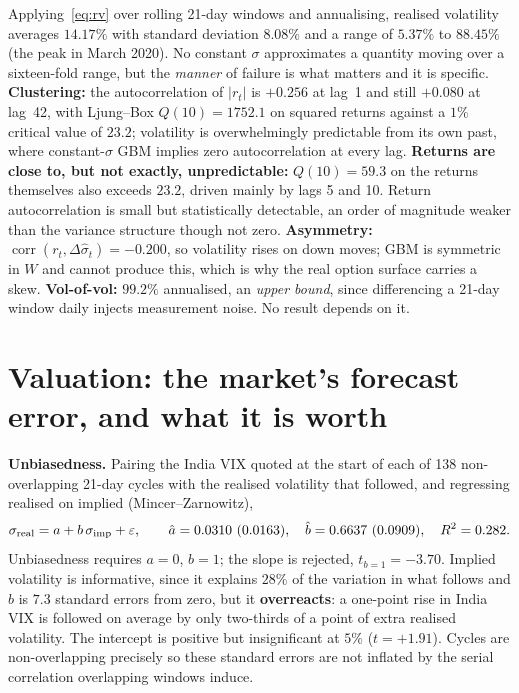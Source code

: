 \documentclass[10pt,a4paper]{article}
\begin{document}
Applying~\eqref{eq:rv} over rolling 21-day windows and annualising, realised volatility
averages $\mathbf{14.17\%}$ with standard deviation $8.08\%$ and a range of
$\mathbf{5.37\%}$ to $\mathbf{88.45\%}$ (the peak in March 2020). No constant $\sigma$
approximates a quantity moving over a sixteen-fold range, but the \emph{manner} of failure is
what matters and it is specific. \textbf{Clustering:} the autocorrelation of $|r_t|$ is
$+0.256$ at lag~1 and still $+0.080$ at lag~42, with Ljung--Box $Q(10)=1752.1$ on squared
returns against a $1\%$ critical value of $23.2$; volatility is overwhelmingly predictable from
its own past, where constant-$\sigma$ GBM implies zero autocorrelation at every lag.
\textbf{Returns are close to, but not exactly, unpredictable:} $Q(10)=59.3$ on the returns
themselves also exceeds $23.2$, driven mainly by lags 5 and 10. Return autocorrelation is small
but statistically detectable, an order of magnitude weaker than the variance structure though
not zero. \textbf{Asymmetry:} $\operatorname{corr}(r_t,\Delta\hat\sigma_t)=-0.200$, so volatility
rises on down moves; GBM is symmetric in $W$ and cannot produce this, which is why the real
option surface carries a skew. \textbf{Vol-of-vol:} $99.2\%$ annualised, an \emph{upper
bound}, since differencing a 21-day window daily injects measurement noise. No result depends
on it.

\section{Valuation: the market's forecast error, and what it is worth}
\label{sec:value}

\textbf{Unbiasedness.} Pairing the India VIX quoted at the start of each of 138
non-overlapping 21-day cycles with the realised volatility that followed, and regressing
realised on implied (Mincer--Zarnowitz),
\[
  \sigma_{\mathrm{real}}=a+b\,\sigma_{\mathrm{imp}}+\varepsilon,\qquad
  \hat a=0.0310\ (0.0163),\quad \hat b=0.6637\ (0.0909),\quad R^2=0.282 .
\]
Unbiasedness requires $a=0$, $b=1$; the slope is rejected, $t_{b=1}=-3.70$. Implied volatility
is informative, since it explains $28\%$ of the variation in what follows and $\hat b$ is $7.3$
standard errors from zero, but it \textbf{overreacts}: a one-point rise in India VIX is
followed on average by only two-thirds of a point of extra realised volatility. The intercept
is positive but insignificant at $5\%$ ($t=+1.91$). Cycles are non-overlapping precisely so
these standard errors are not inflated by the serial correlation overlapping windows induce.
\end{document}
